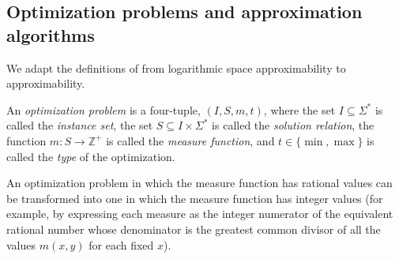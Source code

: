 \documentclass[]{article}
\begin{document}
\subsection{Optimization problems and approximation algorithms}

We adapt the definitions of \cite{tantau07} from logarithmic space approximability to \NC{} approximability.

\begin{definition}
  An \emph{optimization problem} is a four-tuple, $(I, S, m, t)$, where the set $I \subseteq \Sigma^*$ is called the \emph{instance set}, the set $S \subseteq I \times \Sigma^*$ is called the \emph{solution relation}, the function $m \colon S \to \mathbb{Z}^+$ is called the \emph{measure function}, and $t \in \{\min, \max\}$ is called the \emph{type} of the optimization.
\end{definition}

An optimization problem in which the measure function has rational values can be transformed into one in which the measure function has integer values \cite[Page~23]{acgkmp99} (for example, by expressing each measure as the integer numerator of the equivalent rational number whose denominator is the greatest common divisor of all the values $m(x, y)$ for each fixed $x$).
\end{document}
